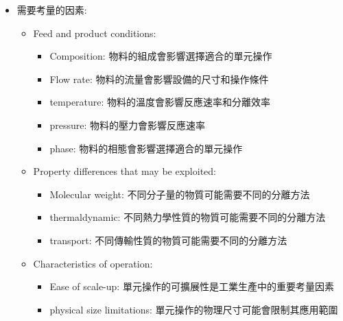 \documentclass[../main.tex]{subfiles}
\begin{document}
\begin{itemize}
\begin{enumerate}
\begin{enumerate}
      \item Stripping: 涉及將氣體成分從液體中移除的過程，如洗滌塔等
      \item Leaching: 涉及將固體中的成分溶解到液體中的過程，如浸出器等
    \end{enumerate}
    \item Electric field:
    \begin{enumerate}
      \item Electrophoresis: 涉及利用電場分離帶電粒子的過程，如電泳裝置等
      \item Electrolysis: 涉及利用電流引發化學反應的過程，如電解槽等
    \end{enumerate}
    \item Magnetic field:涉及利用磁場分離磁性物質的過程，如磁選機等
    \item Gravity/ Centrifugal force: 涉及利用重力或離心力分離不同密度的物質的過程，如沉降池、離心機等
  \end{enumerate}
  \item 需要考量的因素:
  \begin{itemize}
    \item Feed and product conditions:
    \begin{itemize}
      \item Composition: 物料的組成會影響選擇適合的單元操作
      \item Flow rate: 物料的流量會影響設備的尺寸和操作條件
      \item temperature: 物料的溫度會影響反應速率和分離效率
      \item pressure: 物料的壓力會影響反應速率
      \item phase: 物料的相態會影響選擇適合的單元操作
    \end{itemize}
    \item Property differences that may be exploited:
    \begin{itemize}
      \item Molecular weight: 不同分子量的物質可能需要不同的分離方法
      \item thermaldynamic: 不同熱力學性質的物質可能需要不同的分離方法
      \item transport: 不同傳輸性質的物質可能需要不同的分離方法
    \end{itemize}
    \item Characteristics of operation:
    \begin{itemize}
      \item Ease of scale-up: 單元操作的可擴展性是工業生產中的重要考量因素
      \item physical size limitations: 單元操作的物理尺寸可能會限制其應用範圍

\end{itemize}
\end{itemize}
\end{itemize}
\end{document}

